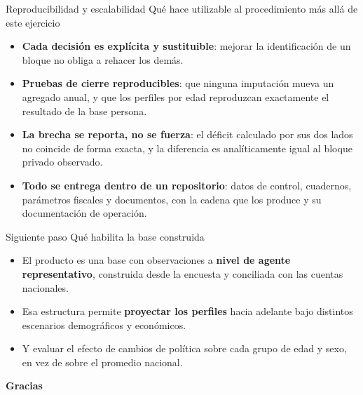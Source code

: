 \documentclass[aspectratio=169,11pt]{beamer}
\newcommand{\bajada}[1]{{\small\textcolor{gris}{#1}}\vspace{0.5em}}
\begin{document}
\begin{frame}{Reproducibilidad y escalabilidad}
\bajada{Qué hace utilizable al procedimiento más allá de este ejercicio}

\begin{itemize}\itemsep0.5em
  \item \textbf{Cada decisión es explícita y sustituible}: mejorar la identificación de un bloque
        no obliga a rehacer los demás.
  \item \textbf{Pruebas de cierre reproducibles}: que ninguna imputación mueva un agregado anual,
        y que los perfiles por edad reproduzcan exactamente el resultado de la base persona.
  \item \textbf{La brecha se reporta, no se fuerza}: el déficit calculado por sus dos lados no
        coincide de forma exacta, y la diferencia es analíticamente igual al bloque privado
        observado.
  \item \textbf{Todo se entrega dentro de un repositorio}: datos de control, cuadernos, parámetros
        fiscales y documentos, con la cadena que los produce y su documentación de operación.
\end{itemize}
\end{frame}

\begin{frame}{Siguiente paso}
\bajada{Qué habilita la base construida}

\begin{itemize}\itemsep0.7em
  \item El producto es una base con observaciones a \textbf{nivel de agente representativo},
        construida desde la encuesta y conciliada con las cuentas nacionales.
  \item Esa estructura permite \textbf{proyectar los perfiles} hacia adelante bajo distintos
        escenarios demográficos y económicos.
  \item Y evaluar el efecto de cambios de política sobre cada grupo de edad y sexo, en vez de
        sobre el promedio nacional.
\end{itemize}

\vfill
\begin{center}
{\large\textcolor{acento}{\textbf{Gracias}}}
\end{center}
\end{frame}

\appendix
\end{document}
